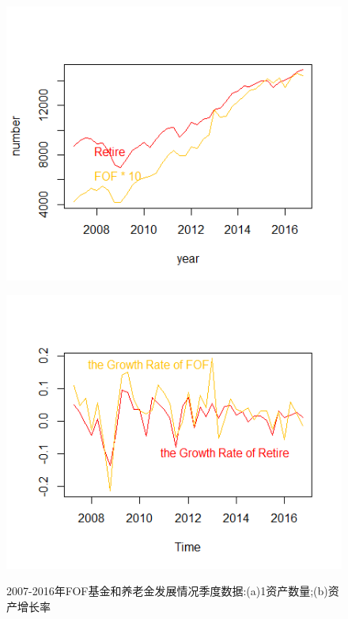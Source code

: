 \begin{figure}[h!]
	\begin{minipage}[ht]{0.47\textwidth}
		\centering
		\includegraphics[width=1\textwidth]{pic/3-0-1.png}
		\subcaption{}\label{pic/3-0-1.png}
	\end{minipage}%
	\hspace{0.06\textwidth}
	\begin{minipage}[ht]{0.47\textwidth}
		\centering
		\includegraphics[width=1\textwidth]{pic/3-0-2.png}
		\subcaption{}\label{pic/3-0-2.png}
	\end{minipage}
	\caption{2007-2016年FOF基金和养老金发展情况季度数据:(a)1资产数量;(b)资产增长率} \label{pic:3-0}
\end{figure}





